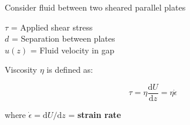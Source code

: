 \documentclass{beamer}
\begin{document}
\begin{frame}
\begin{columns}[t]
\begin{column}{0.45\paperwidth}
      Consider fluid between two sheared parallel plates\\

      \vspace{0.5cm}

      $\tau$ = Applied shear stress \\

      $d$ = Separation between plates \\

      $u(z)$ = Fluid velocity in gap \\

      \vspace{0.5cm}

      Viscosity $\eta$ is defined as:

      $$ \tau = \eta \frac{\mathrm{d} U}{\mathrm{d} z} = \eta \dot{\epsilon}$$

      where $\dot{\epsilon} = \mathrm{d} U / \mathrm{d} z$ = \textbf{strain rate}
    \end{column}

  \end{columns}
\end{frame}
\end{document}
